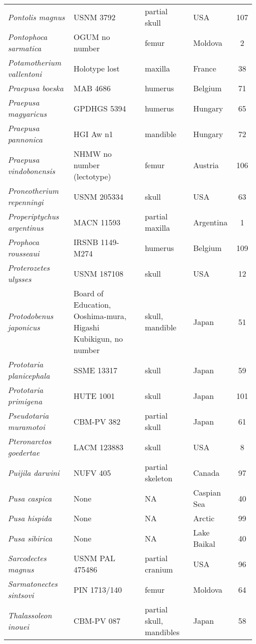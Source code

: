 \begin{longtable}{p{}p{}p{}lc}
\textit{Pontolis magnus} &	USNM 3792 & 	partial skull & 	USA & 107\\
\textit{Pontophoca sarmatica} &	OGUM no number	& femur	& Moldova & 2\\
\textit{Potamotherium vallentoni}	 & Holotype lost	& maxilla	& France & 38\\
\textit{Praepusa boeska} &	MAB 4686 & 	humerus & 	Belgium & 	71\\
\textit{Praepusa magyaricus} &	GPDHGS 5394 & 	humerus & 	Hungary & 65\\
\textit{Praepusa pannonica} &	HGI Aw n1 & 	mandible & 	Hungary & 72\\
\textit{Praepusa vindobonensis} &	NHMW no number (lectotype) & 	femur & 	Austria & 106\\
\textit{Proneotherium repenningi} &	USNM 205334 & 	skull & 	USA & 63\\
\textit{Properiptychus argentinus} &	MACN 11593 & 	partial maxilla & 	Argentina & 1\\
\textit{Prophoca rousseaui} &	IRSNB 1149-M274 & 	humerus	 & Belgium	& 109\\
\textit{Proterozetes ulysses} &	USNM 187108 & 	skull & 	USA	 & 12\\
\textit{Protodobenus japonicus} & Board of Education, Ooshima-mura, Higashi Kubikigun, no number & 	skull, mandible & 	Japan & 51\\
\textit{Prototaria planicephala} &	SSME 13317 & 	skull & 	Japan & 59\\
\textit{Prototaria primigena} &	HUTE 1001 & 	skull & 	Japan & 101\\
\textit{Pseudotaria muramotoi} &	CBM-PV 382 & 	partial skull & 	Japan & 61\\
\textit{Pteronarctos goedertae} &	LACM 123883 & 	skull & 	USA	 & 8\\
\textit{Puijila darwini}	& NUFV 405	& partial skeleton	& Canada & 97\\
\textit{Pusa caspica} &	None & 	NA & 	Caspian Sea & 40\\
\textit{Pusa hispida} &	None & 	NA & 	Arctic & 99\\
\textit{Pusa sibirica} &	None & 	NA & 	Lake Baikal & 40\\
\textit{Sarcodectes magnus} &	USNM PAL 475486 & 	partial cranium & 	USA & 96\\
\textit{Sarmatonectes sintsovi}	& PIN 1713/140	& femur	& Moldova & 64\\
\textit{Thalassoleon inouei} &	CBM-PV 087 & 	partial skull, mandibles & 	Japan & 58\\

\end{longtable}
